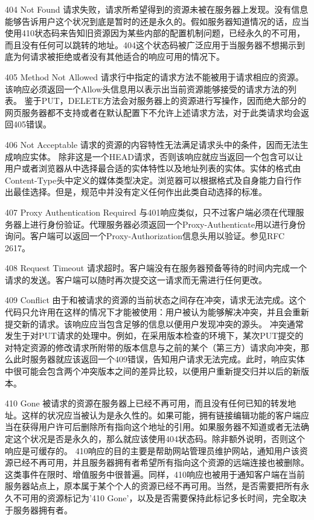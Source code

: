 404 Not Found
请求失败，请求所希望得到的资源未被在服务器上发现。没有信息能够告诉用户这个状况到底是暂时的还是永久的。假如服务器知道情况的话，应当使用410状态码来告知旧资源因为某些内部的配置机制问题，已经永久的不可用，而且没有任何可以跳转的地址。404这个状态码被广泛应用于当服务器不想揭示到底为何请求被拒绝或者没有其他适合的响应可用的情况下。

405 Method Not Allowed
请求行中指定的请求方法不能被用于请求相应的资源。该响应必须返回一个Allow头信息用以表示出当前资源能够接受的请求方法的列表。
鉴于PUT，DELETE方法会对服务器上的资源进行写操作，因而绝大部分的网页服务器都不支持或者在默认配置下不允许上述请求方法，对于此类请求均会返回405错误。

406 Not Acceptable
请求的资源的内容特性无法满足请求头中的条件，因而无法生成响应实体。
除非这是一个HEAD请求，否则该响应就应当返回一个包含可以让用户或者浏览器从中选择最合适的实体特性以及地址列表的实体。实体的格式由Content-Type头中定义的媒体类型决定。浏览器可以根据格式及自身能力自行作出最佳选择。但是，规范中并没有定义任何作出此类自动选择的标准。

407 Proxy Authentication Required
与401响应类似，只不过客户端必须在代理服务器上进行身份验证。代理服务器必须返回一个Proxy-Authenticate用以进行身份询问。客户端可以返回一个Proxy-Authorization信息头用以验证。参见RFC 2617。

408 Request Timeout
请求超时。客户端没有在服务器预备等待的时间内完成一个请求的发送。客户端可以随时再次提交这一请求而无需进行任何更改。

409 Conflict
由于和被请求的资源的当前状态之间存在冲突，请求无法完成。这个代码只允许用在这样的情况下才能被使用：用户被认为能够解决冲突，并且会重新提交新的请求。该响应应当包含足够的信息以便用户发现冲突的源头。
冲突通常发生于对PUT请求的处理中。例如，在采用版本检查的环境下，某次PUT提交的对特定资源的修改请求所附带的版本信息与之前的某个（第三方）请求向冲突，那么此时服务器就应该返回一个409错误，告知用户请求无法完成。此时，响应实体中很可能会包含两个冲突版本之间的差异比较，以便用户重新提交归并以后的新版本。

410 Gone
被请求的资源在服务器上已经不再可用，而且没有任何已知的转发地址。这样的状况应当被认为是永久性的。如果可能，拥有链接编辑功能的客户端应当在获得用户许可后删除所有指向这个地址的引用。如果服务器不知道或者无法确定这个状况是否是永久的，那么就应该使用404状态码。除非额外说明，否则这个响应是可缓存的。
410响应的目的主要是帮助网站管理员维护网站，通知用户该资源已经不再可用，并且服务器拥有者希望所有指向这个资源的远端连接也被删除。这类事件在限时、增值服务中很普遍。同样，410响应也被用于通知客户端在当前服务器站点上，原本属于某个个人的资源已经不再可用。当然，是否需要把所有永久不可用的资源标记为'410 Gone'，以及是否需要保持此标记多长时间，完全取决于服务器拥有者。

